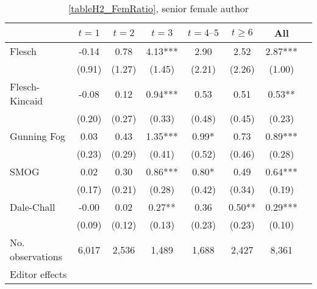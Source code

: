 \begin{table}
    \footnotesize
    \centering
    \begin{threeparttable}
        \caption{\autoref{tableH2_FemRatio}, senior female author}
        \label{tableH2_FemSenior}
        \begin{tabular}{p{3cm}S@{}S@{}S@{}S@{}S@{}S@{}S@{}}
            \toprule
            &{\(t=1\)}&{\(t=2\)}&{\(t=3\)}&{\(t=4\text{--}5\)}&{\(t\ge6\)}&{All}\\
            \midrule
            Flesch                        &       -0.14   &        0.78   &        4.13***&        2.90   &        2.52   &        2.87***\\
                                          &      (0.91)   &      (1.27)   &      (1.45)   &      (2.21)   &      (2.26)   &      (1.00)   \\
            Flesch-Kincaid                &       -0.08   &        0.12   &        0.94***&        0.53   &        0.51   &        0.53** \\
                                          &      (0.20)   &      (0.27)   &      (0.33)   &      (0.48)   &      (0.45)   &      (0.23)   \\
            Gunning Fog                   &        0.03   &        0.43   &        1.35***&        0.99*  &        0.73   &        0.89***\\
                                          &      (0.23)   &      (0.29)   &      (0.41)   &      (0.52)   &      (0.46)   &      (0.28)   \\
            SMOG                          &        0.02   &        0.30   &        0.86***&        0.80*  &        0.49   &        0.64***\\
                                          &      (0.17)   &      (0.21)   &      (0.28)   &      (0.42)   &      (0.34)   &      (0.19)   \\
            Dale-Chall                    &       -0.00   &        0.02   &        0.27** &        0.36   &        0.50** &        0.29***\\
                                          &      (0.09)   &      (0.12)   &      (0.13)   &      (0.23)   &      (0.23)   &      (0.10)   \\
            \midrule
            No. observations              &       6,017   &       2,536   &       1,489   &       1,688   &       2,427   &       8,361   \\
            \midrule
            Editor effects       &           {}   &           {}   &           {}   &           {}   &           {}   &           {}   \\

\end{tabular}
\end{threeparttable}
\end{table}
